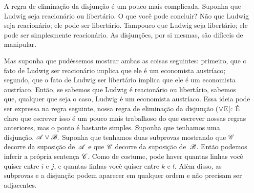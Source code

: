 A regra de eliminação da disjunção é um pouco mais complicada. Suponha que Ludwig seja reacionário ou libertário. O que você pode concluir? Não que Ludwig seja reacionário; ele pode ser libertário. Tampouco que Ludwig seja libertário; ele pode ser simplesmente reacionário. As disjunções, por si mesmas, são difíceis de manipular.

Mas suponha que pudéssemos mostrar ambas as coisas seguintes: primeiro, que o fato de Ludwig ser reacionário implica que ele é um economista austríaco; segundo, que o fato de Ludwig ser libertário implica que ele é um economista austríaco. Então, se sabemos que Ludwig é reacionário ou libertário, sabemos que, qualquer que seja o caso, Ludwig é um economista austríaco. Essa ideia pode ser expressa na regra seguinte, nossa regra de eliminação da disjunção ($\vee$E):
É claro que escrever isso é um pouco mais trabalhoso do que escrever nossas regras anteriores, mas o ponto é bastante simples. Suponha que tenhamos uma disjunção, $\mathscr{A} \vee \mathscr{B}$. Suponha que tenhamos duas subprovas mostrando que $\mathscr{C}$ decorre da suposição de~$\mathscr{A}$ e que $\mathscr{C}$ decorre da suposição de~$\mathscr{B}$. Então podemos inferir a própria sentença $\mathscr{C}$. Como de costume, pode haver quantas linhas você quiser entre $i$ e $j$, e quantas linhas você quiser entre $k$ e $l$. Além disso, as subprovas e a disjunção podem aparecer em qualquer ordem e não precisam ser adjacentes.

